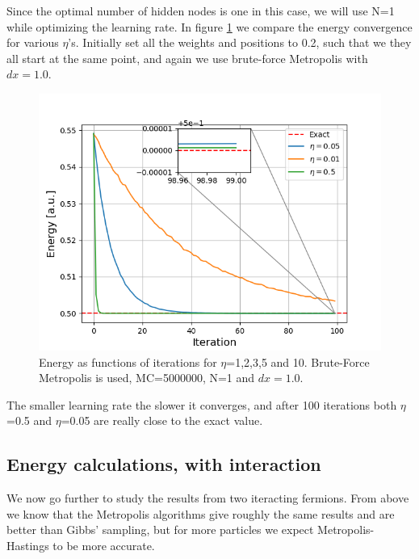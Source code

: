 \documentclass[norsk,a4paper,12pt]{article}
\begin{document}
Since the optimal number of hidden nodes is one in this case, we will use N=1 while optimizing the learning rate. In figure \ref{fig:compare_etas} we compare the energy convergence for various $\eta$'s.  Initially set all the weights and positions to 0.2, such that we they all start at the same point, and again we use brute-force Metropolis with $dx=1.0$.

 \begin{figure} [H]
 	\centering
 	\includegraphics[scale=0.8]{plots/energy_compare_eta.png}
 	\caption{Energy as functions of iterations for $\eta$=1,2,3,5 and 10. Brute-Force Metropolis is used, MC=5000000, N=1 and $dx=1.0$.}
 	\label{fig:compare_etas}
 \end{figure}
The smaller learning rate the slower it converges, and after 100 iterations both $\eta$=0.5 and $\eta$=0.05 are really close to the exact value. 

\subsection{Energy calculations, with interaction}
We now go further to study the results from two iteracting fermions. From above we know that the Metropolis algorithms give roughly the same results and are better than Gibbs' sampling, but for more particles we expect Metropolis-Hastings to be more accurate.
\end{document}
